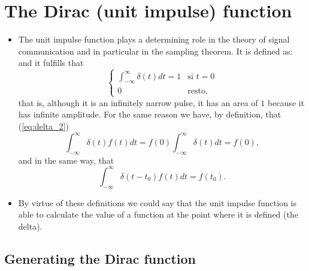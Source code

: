 \section{The Dirac (unit impulse) function}
\begin{itemize}
\item The unit impulse function \cite{Lathi} plays a determining role
  in the theory of signal communication and in particular in the
  sampling theorem. It is defined as:
  and it fulfills that
  \begin{equation}
    \left\{
      \begin{array}{ll}
        \displaystyle\int_{-\infty}^\infty\delta(t)dt=1 & \text{si $t=0$}\\
        0 & \text{resto,}
      \end{array}
    \right.
    \tag{delta\_1}
    \label{eq:delta_1}
  \end{equation}
  that is, although it is an infinitely narrow pulse, it has an area
  of $1$ because it has infinite amplitude. For the same reason we have,
  by definition, that (\ref{eq:delta_2})
  \begin{equation}
    \int_{-\infty}^\infty\delta(t)f(t)dt =
    f(0)\int_{-\infty}^\infty\delta(t)dt = f(0),
    \tag{delta\_2}
    \label{eq:delta_2}
  \end{equation}
  and in the same way, that
  \begin{equation*}
    \int_{-\infty}^\infty\delta(t-t_0)f(t)dt = f(t_0).
  \end{equation*}
\item By virtue of these definitions we could say that the unit
  impulse function is able to calculate the value of a function at the
  point where it is defined (the delta).
\end{itemize}

\subsection{Generating the Dirac function}

